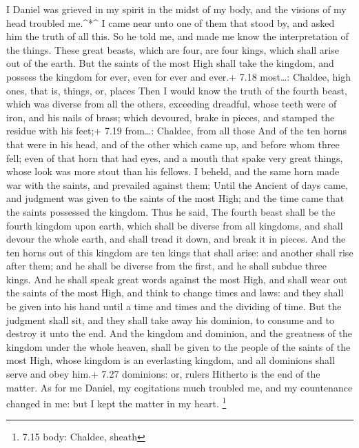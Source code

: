  I Daniel was grieved in my spirit in the midst of my body,
and the visions of my head troubled me.\^{}*\^{}  I came
near unto one of them that stood by, and asked him the truth of all
this. So he told me, and made me know the interpretation of the things.
 These great beasts, which are four, are four kings, which
shall arise out of the earth.  But the saints of the most
High shall take the kingdom, and possess the kingdom for ever, even for
ever and ever.+ 7.18 most\ldots: Chaldee, high ones, that is, things,
or, places  Then I would know the truth of the fourth
beast, which was diverse from all the others, exceeding dreadful, whose
teeth were of iron, and his nails of brass; which devoured, brake in
pieces, and stamped the residue with his feet;+ 7.19 from\ldots:
Chaldee, from all those  And of the ten horns that were in
his head, and of the other which came up, and before whom three fell;
even of that horn that had eyes, and a mouth that spake very great
things, whose look was more stout than his fellows.  I
beheld, and the same horn made war with the saints, and prevailed
against them;  Until the Ancient of days came, and judgment
was given to the saints of the most High; and the time came that the
saints possessed the kingdom.  Thus he said, The fourth
beast shall be the fourth kingdom upon earth, which shall be diverse
from all kingdoms, and shall devour the whole earth, and shall tread it
down, and break it in pieces.  And the ten horns out of
this kingdom are ten kings that shall arise: and another shall rise
after them; and he shall be diverse from the first, and he shall subdue
three kings.  And he shall speak great words against the
most High, and shall wear out the saints of the most High, and think to
change times and laws: and they shall be given into his hand until a
time and times and the dividing of time.  But the judgment
shall sit, and they shall take away his dominion, to consume and to
destroy it unto the end.  And the kingdom and dominion, and
the greatness of the kingdom under the whole heaven, shall be given to
the people of the saints of the most High, whose kingdom is an
everlasting kingdom, and all dominions shall serve and obey him.+ 7.27
dominions: or, rulers  Hitherto is the end of the matter.
As for me Daniel, my cogitations much troubled me, and my countenance
changed in me: but I kept the matter in my heart. \footnote{7.15 body:
  Chaldee, sheath}

